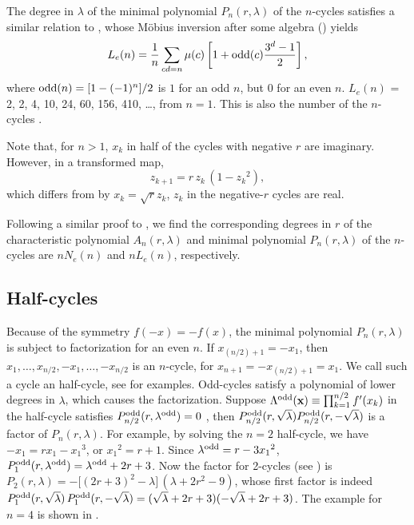 \documentclass[twocolumn]{revtex4-1}
\begin{document}
The degree in $\lambda$ of
the minimal polynomial $P_n(r, \lambda)$ of the $n$-cycles
satisfies a similar relation to ,
%
whose M\"obius inversion
after some algebra () yields
\begin{equation}
  L_e(n) = \frac{1}{n} \sum_{cd = n} \mu(c)
    \left[
      1 + \mathrm{odd}(c)\frac{3^d-1}{2}
    \right],
\label{eq:cublyndon}
\end{equation}
where $\mathrm{odd}(n) = [1 - (-1)^n]/2$
is $1$ for an odd $n$,
but $0$ for an even $n$.
%
%
$L_e(n)$ = 2, 2, 4, 10, 24, 60, 156, 410, \ldots, from $n = 1$.
%
This is also the number of the $n$-cycles \cite{hao}.



Note that, for $n>1$, $x_k$ in half of the cycles with negative $r$
are imaginary.
However, in a transformed map,
\[
z_{k+1} = r \, z_k \, (1 - {z_k}^2),
\]
which differs from  by $x_k = \sqrt{r} z_k$,
$z_k$ in the negative-$r$ cycles are real.



Following a similar proof to ,
we find the corresponding degrees in $r$
of the characteristic polynomial $A_n(r, \lambda)$
  and minimal polynomial $P_n(r, \lambda)$ of the $n$-cycles
are $n N_e(n)$ and $n L_e(n)$, respectively.


\subsection{\label{sec:halfcycle}Half-cycles}

Because of the symmetry $f(-x) = -f(x)$,
the minimal polynomial $P_n(r, \lambda)$
is subject to factorization for an even $n$.
%
If $x_{(n/2)+1} = -x_1$,
  then $x_1, \ldots, x_{n/2}, -x_1, \ldots, -x_{n/2}$
  is an $n$-cycle,
  for $x_{n+1} = - x_{(n/2)+1} = x_1$.
We call such a cycle an half-cycle,
see  for examples.
%
Odd-cycles satisfy a polynomial
  of lower degrees in $\lambda$,
  which causes the factorization.
%
Suppose $\Lambda^{\mathrm{odd}}(\mathbf{x}) \equiv \prod_{k = 1}^{n/2} f'(x_k)$ in the half-cycle
 satisfies $P_{n/2}^{\mathrm{odd}}(r, \lambda^{\mathrm{odd}}) = 0$
\big[where $\lambda^\odd$ is the value of $\Lambda^\odd(\vx)$,
and $\lambda^\odd = \pm\sqrt \lambda$\,\big],
then $P^{\mathrm{odd}}_{n/2}(r, \sqrt \lambda) P^{\mathrm{odd}}_{n/2}(r, -\sqrt \lambda)$
is a factor of $P_{n}(r, \lambda)$.
%
For example, by solving the $n = 2$ half-cycle,
  we have $- x_1 = r x_1 - {x_1}^3$, or ${x_1}^2 = r + 1$.
Since $\lambda^{\mathrm{odd}} = r - 3 {x_1}^2$,
$P^{\mathrm{odd}}_1(r, \lambda^{\mathrm{odd}}) = \lambda^{\mathrm{odd}} + 2 r + 3$.
%
Now the factor for 2-cycles (see )
  is
  $P_2(r,\lambda) = -\big[(2r+3)^2 - \lambda\big]\,(\lambda + 2r^2-9)$,
  whose first factor is indeed
  $P^{\mathrm{odd}}_1(r, \sqrt \lambda) \, P^{\mathrm{odd}}_1(r, -\sqrt \lambda)
   = (\sqrt \lambda + 2 r + 3)(-\sqrt \lambda + 2 r + 3)$.
%
The example for $n=4$ is shown in .
\end{document}
